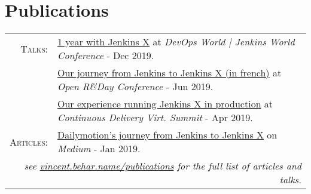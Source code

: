 \documentclass[a4paper,11pt]{article}
\begin{document}
\section{Publications}
\begin{tabular}{rl}
    \textsc{Talks:}&\href{https://vincent.behar.name/publications/2019-12-dwjw-lisbon/}{1 year with Jenkins X} at \textit{DevOps World | Jenkins World Conference} - Dec 2019.\\
    &\href{https://vincent.behar.name/publications/2019-06-openrday/}{Our journey from Jenkins to Jenkins X (in french)} at \textit{Open R\&Day Conference} - Jun 2019.\\
    &\href{https://vincent.behar.name/publications/2019-04-cdconference/}{Our experience running Jenkins X in production} at \textit{Continuous Delivery Virt. Summit} - Apr 2019.\\
    \textsc{Articles:}&\href{https://vincent.behar.name/publications/2019-01-article-from-jenkins-to-jenkins-x/}{Dailymotion's journey from Jenkins to Jenkins X} on \textit{Medium} - Jan 2019.\\
  \multicolumn{2}{r}{\footnotesize\itshape see \href{https://vincent.behar.name/publications/}{vincent.behar.name/publications} for the full list of articles and talks.}\\
\end{tabular}
\end{document}
